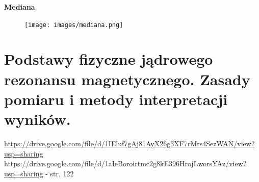 \documentclass{article}
\begin{document}
\textbf{Mediana}
\begin{figure}[H]
    \centering
    \texttt{[image: images/mediana.png]}
\end{figure}


\section{Podstawy fizyczne jądrowego rezonansu magnetycznego. Zasady pomiaru i metody interpretacji wyników.}
\url{https://drive.google.com/file/d/1IEluf7gAj81AyX26g3XF7rMrs4SezWAN/view?usp=sharing} \\

\url{https://drive.google.com/file/d/1aIeBoroirtmc2g8kE396HrojLworsYAz/view?usp=sharing} - str. 122
\end{document}
